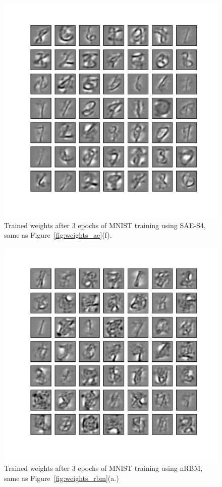 \begin{figure}
	\centering
	\includegraphics[width=\textwidth]{pics_sdlm/43_MNIST_SAE_all/2_60000_0.pdf}
	\caption[Trained weights of SAE-S4, same as Figure~\ref{fig:weights_ae}(f).]{Trained weights after 3 epochs of MNIST training using SAE-S4, same as Figure~\ref{fig:weights_ae}(f).}
	\label{fig:weights_ae6}
\end{figure}


\begin{figure}
	\centering
	\includegraphics[width=\textwidth]{pics_sdlm/32_MNIST_RBM/2_60000_0.pdf}
	\caption[Trained weights of nRBM, same as Figure~\ref{fig:weights_rbm}(a).]{Trained weights after 3 epochs of MNIST training using nRBM, same as Figure~\ref{fig:weights_rbm}(a.)}
	\label{fig:weights_rbm1}
\end{figure}

